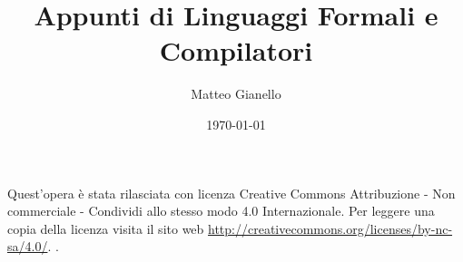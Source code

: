 \documentclass[a4paper,11pt, twoside]{article}
\title{Appunti di Linguaggi Formali e Compilatori}
\author{Matteo Gianello}
\date{\today}
\theoremstyle{definition}
\begin{document}
\pagestyle{empty}
\thispagestyle{empty}
\maketitle
\vspace{5cm}
\begin{center}
Quest'opera è stata rilasciata con licenza Creative Commons Attribuzione - Non commerciale - Condividi allo stesso modo 4.0 Internazionale. Per leggere una copia della licenza visita il sito web \url{http://creativecommons.org/licenses/by-nc-sa/4.0/}. \ccbyncsa.
\end{center}
\newpage

\thispagestyle{plain}
\tableofcontents
\newpage

\pagestyle{plain}

%
%
%
%
%
%
%
%

\newpage
\listoffigures
\end{document}
